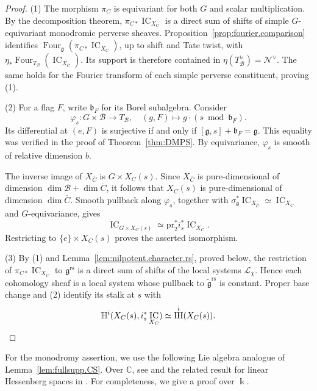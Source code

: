 \documentclass[11pt]{amsart}
\numberwithin{equation}{section}
\theoremstyle{definition}
\newcommand\grs{\mathfrak{g}^{\mathrm{rs}}}
\newcommand\tgrs{\widetilde{\mathfrak{g}}^{\mathrm{rs}}}
\DeclareMathOperator{\IC}{\mathrm{IC}}
\DeclareMathOperator{\Four}{Four}
\def\cB{\mathcal {B}}
\def\C{\mathbb{C}}
\def\fg{\mathfrak {g}}
\def\fb{\mathfrak {b}}
\def\pr{\mathrm{pr}}
\DeclareMathOperator{\IH}{\mathrm{IH}}
\begin{document}
\begin{proof}
(1) The morphism $\pi_C$ is equivariant for both $G$ and scalar multiplication.
By the decomposition theorem, $\pi_{C*}\IC_{X_C}$ is a direct sum of shifts of simple $G$-equivariant monodromic perverse sheaves.
Proposition~\ref{prop:fourier.comparison} identifies $\Four_\fg(\pi_{C*}\IC_{X_C})$, up to shift and Tate twist, with $\eta_*\Four_{T_{\cB}}(\IC_{X_{\overline C}})$.
Its support is therefore contained in $\eta(T^\vee_{\cB})=\mathcal N^\vee$.
The same holds for the Fourier transform of each simple perverse constituent, proving (1).

(2) For a flag $F$, write $\fb_F$ for its Borel subalgebra.
Consider
\[
\varphi_s:G\times\cB\longrightarrow T_{\cB},
\quad
(g,F)\mapsto g\cdot(s\bmod\fb_F).
\]
Its differential at $(e,F)$ is surjective if and only if $[\fg,s]+\fb_F=\fg$.
This equality was verified in the proof of Theorem~\ref{thm:DMPS}.
By equivariance, $\varphi_s$ is smooth of relative dimension $b$.

The inverse image of $X_{\overline C}$ is
$G\times X_C(s)$.
Since $X_{\overline C}$ is pure-dimensional of dimension $\dim\cB+\dim\overline C$, it follows that $X_C(s)$ is pure-dimensional of dimension $\dim\overline C$.
Smooth pullback along $\varphi_s$, together with $\sigma_\fg^*\IC_{X_{\overline C}}\simeq\IC_{X_C}$ and $G$-equivariance, gives
\[
\IC_{G\times X_C(s)} \simeq \pr_2^*i_s^*\IC_{X_C}.
\]
Restricting to $\{e\}\times X_C(s)$ proves the asserted
isomorphism.


(3) By (1) and Lemma~\ref{lem:nilpotent.character.rs}, proved below, the restriction of $\pi_{C*}\IC_{X_C}$ to $\grs$ is a direct sum of shifts of the local systems $\mathcal L_\chi$.
Hence each cohomology sheaf is a local system whose pullback to $\tgrs$ is constant.
Proper base change and (2) identify its stalk at $s$ with
\[
\mathbb H^i(X_C(s),i_s^*\IC_{X_C}) \simeq \IH^i(X_C(s)). \qedhere
\]
\end{proof}




For the monodromy assertion, we use the following Lie algebra analogue of Lemma~\ref{lem:fullsupp.CS}. %
Over $\C$, see \cite[Lemma~6.1]{Mautner} and the related result for linear Hessenberg spaces in \cite[Proposition~2]{VX}.
For completeness, we give a proof over $\Bbbk$.



\end{document}
